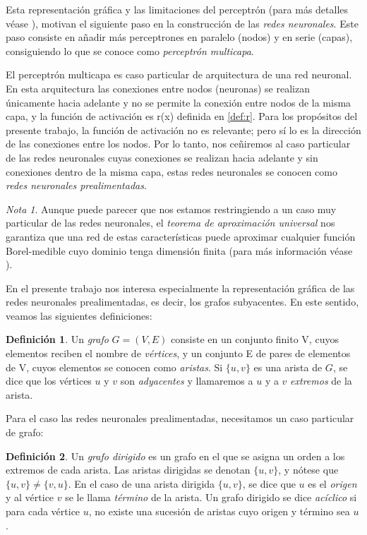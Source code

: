 \documentclass[12pt, a4paper, twoside]{book}
\numberwithin{equation}{section}
\theoremstyle{definition}
\newtheorem{defi}{Definición}
\theoremstyle{remark}
\newtheorem*{remark}{Nota}
\theoremstyle{plain}
\begin{document}
	Esta representación gráfica y las limitaciones del perceptrón (para 
	más detalles véase \cite{}), motivan el siguiente paso en la 
	construcción de las \emph{redes neuronales}. Este paso consiste en 
	añadir más perceptrones en paralelo (nodos) y en serie (capas), 
	consiguiendo lo que se conoce como \emph{perceptrón multicapa}.

	El perceptrón multicapa es caso particular de arquitectura de una red 
	neuronal. En esta arquitectura las conexiones entre nodos (neuronas) 
	se realizan únicamente hacia adelante y no se permite la conexión 
	entre nodos de la misma capa, y la función de activación es 
	r(x) definida en \ref{def:r}. Para los propósitos del presente 
	trabajo, la función de activación no es relevante; pero sí lo es la 
	dirección de las conexiones entre los nodos. Por lo tanto, nos 
	ceñiremos al caso particular de las redes neuronales cuyas conexiones
	se realizan hacia adelante y sin conexiones dentro de la misma capa, 
	estas redes neuronales se conocen como \emph{redes neuronales 
	prealimentadas}. 
	
	\begin{remark}
	Aunque puede parecer que nos 
	estamos restringiendo a un caso muy particular de las redes 
	neuronales, el \emph{teorema de aproximación universal} nos garantiza
	que una red de estas características puede aproximar cualquier función
	Borel-medible cuyo dominio tenga dimensión finita (para más 
	información véase \cite{TeoremaAproxUn-Kurt}).
	\end{remark}

	En el presente trabajo nos interesa especialmente la representación 
	gráfica de las redes neuronales prealimentadas, es decir, los grafos 
	subyacentes. En este sentido, veamos las siguientes definiciones:

	\begin{defi}
		Un \textit{grafo} $G=(V,E)$ consiste en un conjunto finito V, 
		cuyos 
		elementos reciben el nombre de \textit{vértices}, y un 
		conjunto 
		E de pares de elementos de V, cuyos elementos se conocen como 
		\textit{aristas}. Si $\{u,v\}$ es una arista de $G$, se dice 
		que los vértices $u$ y $v$ son \textit{adyacentes} y 
		llamaremos a $u$ y a $v$ \textit{extremos} de la arista.
	\end{defi}

	Para el caso las redes neuronales prealimentadas, necesitamos un caso 
	particular de grafo:
	\begin{defi}
		Un \textit{grafo dirigido} es un grafo en el que se asigna un 
		orden a los extremos de cada arista. Las aristas dirigidas se
		denotan $\{u,v\}$, y nótese que $\{u,v\}\neq\{v,u\}$. En el 
		caso de una arista dirigida $\{u,v\}$, se dice que $u$ es el 
		\textit{origen} y al vértice $v$ se le llama \textit{término} 
		de la arista. Un grafo dirigido se dice \textit{acíclico} si 
		para cada vértice $u$, no existe una sucesión de aristas cuyo
		origen y término sea $u$.
	\end{defi}
\end{document}
